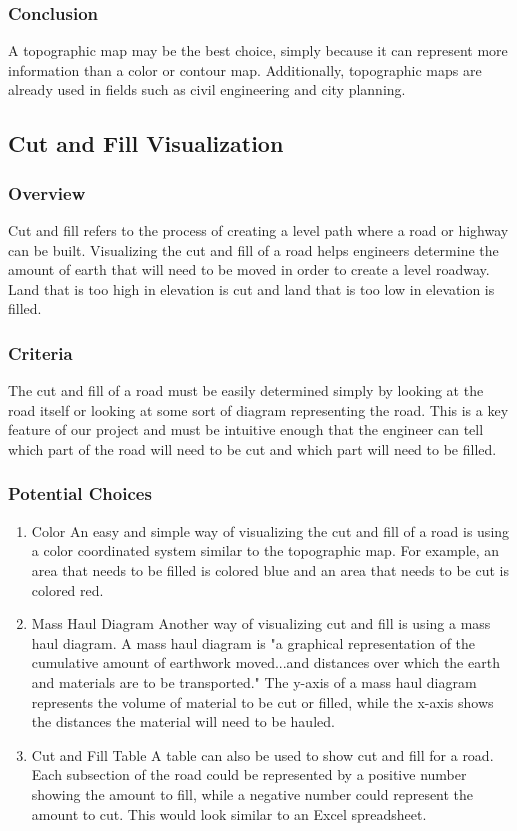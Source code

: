 \subsubsection{Conclusion}
A topographic map may be the best choice, simply because it can represent more information than a color or contour map.
Additionally, topographic maps are already used in fields such as civil engineering and city planning.

\subsection{Cut and Fill Visualization}
\subsubsection{Overview}
Cut and fill refers to the process of creating a level path where a road or highway can be built.
Visualizing the cut and fill of a road helps engineers determine the amount of earth that will need to be moved in order to create a level roadway.
Land that is too high in elevation is cut and land that is too low in elevation is filled.

\subsubsection{Criteria}
The cut and fill of a road must be easily determined simply by looking at the road itself or looking at some sort of diagram representing the road.
This is a key feature of our project and must be intuitive enough that the engineer can tell which part of the road will need to be cut and which part will need to be filled.

\subsubsection{Potential Choices}
\begin{enumerate}
\item{Color}
An easy and simple way of visualizing the cut and fill of a road is using a color coordinated system similar to the topographic map.
For example, an area that needs to be filled is colored blue and an area that needs to be cut is colored red. 

\item{Mass Haul Diagram}
Another way of visualizing cut and fill is using a mass haul diagram.
A mass haul diagram is "a graphical representation of the cumulative amount of earthwork moved...and distances over which the earth and materials are to be transported."
The y-axis of a mass haul diagram represents the volume of material to be cut or filled, while the x-axis shows the distances the material will need to be hauled.

\item{Cut and Fill Table}
A table can also be used to show cut and fill for a road.
Each subsection of the road could be represented by a positive number showing the amount to fill, while a negative number could represent the amount to cut.
This would look similar to an Excel spreadsheet.
\end{enumerate}

